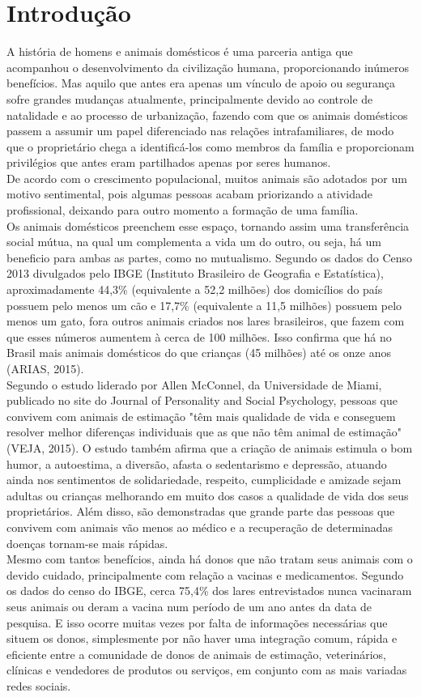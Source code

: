 \chapter{Introdução}
\setcounter{page}{11}
A história de homens e animais domésticos é uma parceria antiga que acompanhou o desenvolvimento da civilização humana, proporcionando inúmeros benefícios. Mas aquilo que antes era apenas um vínculo de apoio ou segurança sofre grandes mudanças atualmente, principalmente devido ao controle de natalidade e ao processo de urbanização, fazendo com que os animais domésticos passem a assumir um papel diferenciado nas relações intrafamiliares, de modo que o proprietário chega a identificá-los como membros da família e proporcionam privilégios que antes eram partilhados apenas por seres humanos.
\\
\indent
De acordo com o crescimento populacional, muitos animais são adotados por um motivo sentimental, pois algumas pessoas acabam priorizando a atividade profissional, deixando para outro momento a formação de uma família.
\\
\indent
Os animais domésticos preenchem esse espaço, tornando assim uma transferência social mútua, na qual um complementa a vida um do outro, ou seja, há um beneficio para ambas as partes, como no mutualismo. Segundo os dados do Censo 2013 divulgados pelo IBGE (Instituto Brasileiro de Geografia e Estatística), aproximadamente 44,3\% (equivalente a 52,2 milhões) dos domicílios do país possuem pelo menos um cão e 17,7\% (equivalente a 11,5 milhões) possuem pelo menos um gato, fora outros animais criados nos lares brasileiros, que fazem com que esses números aumentem à cerca de 100 milhões. Isso confirma que há no Brasil mais animais domésticos do que crianças (45 milhões) até os onze anos (ARIAS, 2015). 
\\
\indent
Segundo o estudo liderado por Allen McConnel, da Universidade de Miami, publicado no site do Journal of Personality and Social Psychology, pessoas que convivem com animais de estimação "têm mais qualidade de vida e conseguem resolver melhor diferenças individuais que as que não têm animal de estimação" (VEJA, 2015). O estudo também afirma que a criação de animais estimula o bom humor, a autoestima, a diversão,  afasta o sedentarismo e depressão, atuando ainda nos sentimentos de solidariedade, respeito, cumplicidade e amizade sejam adultas ou crianças melhorando em muito dos casos a qualidade de vida dos seus proprietários. Além disso, são demonstradas que grande parte das pessoas que convivem com animais vão menos ao médico e a recuperação de determinadas doenças tornam-se mais rápidas. 
\\
\indent
Mesmo com tantos benefícios, ainda há donos que não tratam seus animais com o devido cuidado, principalmente com relação a vacinas e medicamentos. Segundo os dados do censo do IBGE, cerca 75,4\% dos lares entrevistados nunca vacinaram seus animais ou deram a vacina num período de um ano antes da data de pesquisa. E isso ocorre muitas vezes por falta de informações necessárias que situem os donos, simplesmente por não haver uma integração comum, rápida e eficiente entre a comunidade de donos de animais de estimação, veterinários, clínicas e vendedores de produtos ou serviços, em conjunto com as mais variadas redes sociais.

